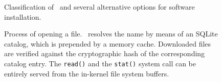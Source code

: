 \begin{figure}
	\begin{center}
		
	\end{center}
	\caption{Classification of \cvmfs\ and several alternative options for software installation.}
	\label{fig:classification}
\end{figure}

\begin{figure}
	\begin{center}
		
	\end{center}
	\caption{Process of opening a file. \cvmfs\ resolves the name by means of an SQLite catalog, which is prepended by a memory cache. Downloaded files are verified against the cryptographic hash of the corresponding catalog entry. The \texttt{read()} and the \texttt{stat()} system call can be entirely served from the in-kernel file system buffers.}
	\label{fig:fuse}
\end{figure}
